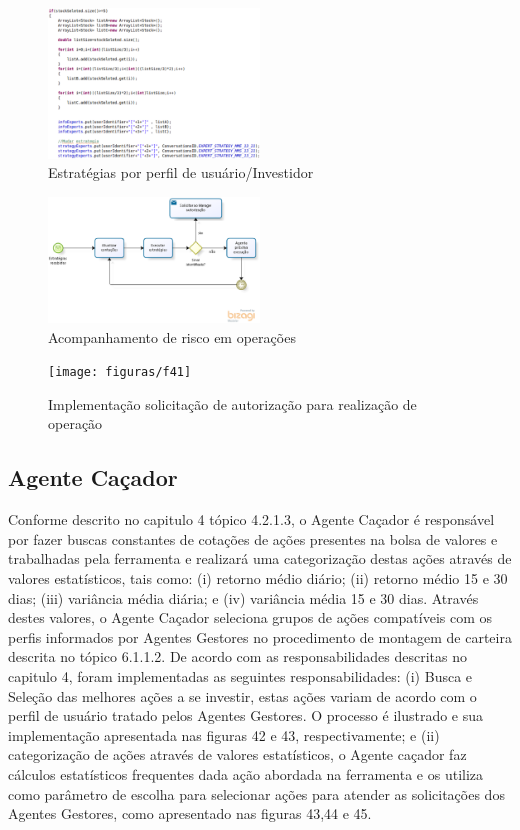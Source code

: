 \begin{figure}[h]
\centering
\label{f39}
\includegraphics[width=0.5\textwidth]{figuras/f39}
\caption{Estratégias por perfil de usuário/Investidor}
\end{figure}

\begin{figure}[h]
\centering
\label{f40}
\includegraphics[width=0.5\textwidth]{figuras/f40}
\caption{Acompanhamento de risco em operações}
\end{figure}

\begin{figure}[h]
\centering
\label{f41}
\texttt{[image: figuras/f41]}
\caption{Implementação solicitação de autorização para realização de operação}
\end{figure}


\subsection{Agente Caçador}

Conforme descrito no capitulo 4 tópico 4.2.1.3, o Agente Caçador é responsável por fazer buscas constantes de cotações de ações presentes na bolsa de valores e trabalhadas pela ferramenta e realizará uma categorização destas ações através de valores estatísticos, tais como: (i) retorno médio diário; (ii) retorno médio 15 e 30 dias; (iii) variância média diária; e (iv) variância média 15 e 30 dias. Através destes valores, o Agente Caçador seleciona grupos de ações compatíveis com os perfis informados por Agentes Gestores no procedimento de montagem de carteira descrita no tópico 6.1.1.2. De acordo com as responsabilidades descritas no capitulo 4, foram implementadas as seguintes responsabilidades: (i) Busca e Seleção das melhores ações a se investir, estas ações variam de acordo com o perfil de usuário tratado pelos Agentes Gestores. O processo é ilustrado e sua implementação apresentada nas figuras 42 e 43, respectivamente; e (ii) categorização de ações através de valores estatísticos, o Agente caçador faz cálculos estatísticos frequentes dada ação abordada na ferramenta e os utiliza como parâmetro de escolha para selecionar ações para atender as solicitações dos Agentes Gestores, como apresentado nas figuras 43,44 e 45.

